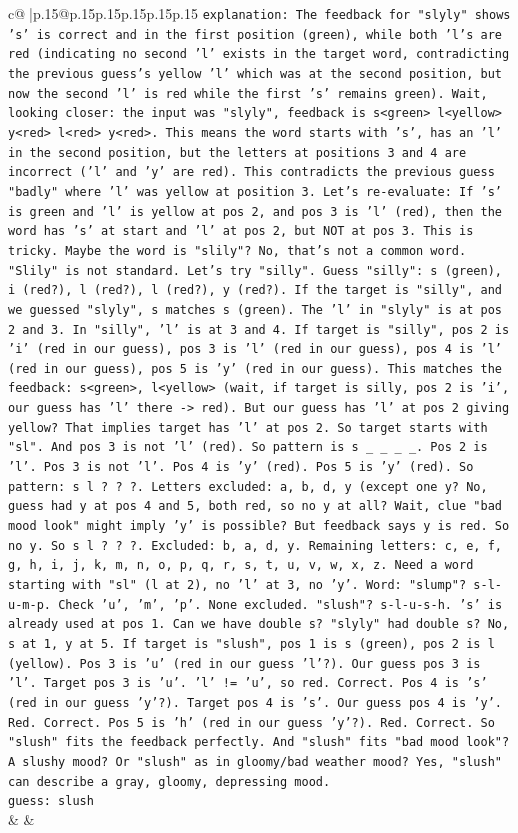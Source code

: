 \documentclass{article}
\begin{document}
{\begin{supertabular}{c@{$\;$}|p{.15\linewidth}@{}p{.15\linewidth}p{.15\linewidth}p{.15\linewidth}p{.15\linewidth}p{.15\linewidth}}
{{{                \texttt{explanation: The feedback for "slyly" shows 's' is correct and in the first position (green), while both 'l's are red (indicating no second 'l' exists in the target word, contradicting the previous guess's yellow 'l' which was at the second position, but now the second 'l' is red while the first 's' remains green). Wait, looking closer: the input was "slyly", feedback is s<green> l<yellow> y<red> l<red> y<red>. This means the word starts with 's', has an 'l' in the second position, but the letters at positions 3 and 4 are incorrect ('l' and 'y' are red). This contradicts the previous guess "badly" where 'l' was yellow at position 3. Let's re{-}evaluate: If 's' is green and 'l' is yellow at pos 2, and pos 3 is 'l' (red), then the word has 's' at start and 'l' at pos 2, but NOT at pos 3. This is tricky. Maybe the word is "slily"? No, that's not a common word. "Slily" is not standard. Let's try "silly". Guess "silly": s (green), i (red?), l (red?), l (red?), y (red?). If the target is "silly", and we guessed "slyly", s matches s (green). The 'l' in "slyly" is at pos 2 and 3. In "silly", 'l' is at 3 and 4. If target is "silly", pos 2 is 'i' (red in our guess), pos 3 is 'l' (red in our guess), pos 4 is 'l' (red in our guess), pos 5 is 'y' (red in our guess). This matches the feedback: s<green>, l<yellow> (wait, if target is silly, pos 2 is 'i', our guess has 'l' there {-}> red). But our guess has 'l' at pos 2 giving yellow? That implies target has 'l' at pos 2. So target starts with "sl". And pos 3 is not 'l' (red). So pattern is s \_ \_ \_ \_. Pos 2 is 'l'. Pos 3 is not 'l'. Pos 4 is 'y' (red). Pos 5 is 'y' (red). So pattern: s l ? ? ?. Letters excluded: a, b, d, y (except one y? No, guess had y at pos 4 and 5, both red, so no y at all? Wait, clue "bad mood look" might imply 'y' is possible? But feedback says y is red. So no y. So s l ? ? ?. Excluded: b, a, d, y. Remaining letters: c, e, f, g, h, i, j, k, m, n, o, p, q, r, s, t, u, v, w, x, z. Need a word starting with "sl" (l at 2), no 'l' at 3, no 'y'. Word: "slump"? s{-}l{-}u{-}m{-}p. Check 'u', 'm', 'p'. None excluded. "slush"? s{-}l{-}u{-}s{-}h. 's' is already used at pos 1. Can we have double s? "slyly" had double s? No, s at 1, y at 5. If target is "slush", pos 1 is s (green), pos 2 is l (yellow). Pos 3 is 'u' (red in our guess 'l'?). Our guess pos 3 is 'l'. Target pos 3 is 'u'. 'l' != 'u', so red. Correct. Pos 4 is 's' (red in our guess 'y'?). Target pos 4 is 's'. Our guess pos 4 is 'y'. Red. Correct. Pos 5 is 'h' (red in our guess 'y'?). Red. Correct. So "slush" fits the feedback perfectly. And "slush" fits "bad mood look"? A slushy mood? Or "slush" as in gloomy/bad weather mood? Yes, "slush" can describe a gray, gloomy, depressing mood.} \\
\texttt{guess: slush} \\
            }
        }
    }
    & & \\ \\


\end{supertabular}}
\end{document}
